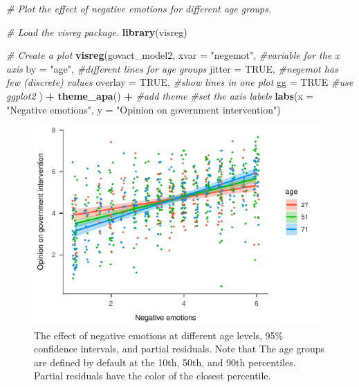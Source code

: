 \documentclass[doc,floatsintext]{apa6}
\newenvironment{Shaded}{\begin{snugshade}}{\end{snugshade}}
\newcommand{\KeywordTok}[1]{\textcolor[rgb]{0.13,0.29,0.53}{\textbf{#1}}}
\newcommand{\DataTypeTok}[1]{\textcolor[rgb]{0.13,0.29,0.53}{#1}}
\newcommand{\StringTok}[1]{\textcolor[rgb]{0.31,0.60,0.02}{#1}}
\newcommand{\CommentTok}[1]{\textcolor[rgb]{0.56,0.35,0.01}{\textit{#1}}}
\newcommand{\OtherTok}[1]{\textcolor[rgb]{0.56,0.35,0.01}{#1}}
\newcommand{\OperatorTok}[1]{\textcolor[rgb]{0.81,0.36,0.00}{\textbf{#1}}}
\newcommand{\NormalTok}[1]{#1}
\begin{document}
\begin{Shaded}
\begin{Highlighting}[]
\CommentTok{# Plot the effect of negative emotions for different age groups.}

\CommentTok{# Load the visreg package.}
\KeywordTok{library}\NormalTok{(visreg)}

\CommentTok{# Create a plot}
\KeywordTok{visreg}\NormalTok{(govact_model2, }
       \DataTypeTok{xvar =} \StringTok{"negemot"}\NormalTok{, }\CommentTok{#variable for the x axis}
       \DataTypeTok{by =} \StringTok{"age"}\NormalTok{, }\CommentTok{#different lines for age groups}
       \DataTypeTok{jitter =} \OtherTok{TRUE}\NormalTok{, }\CommentTok{#negemot has few (discrete) values}
       \DataTypeTok{overlay =} \OtherTok{TRUE}\NormalTok{, }\CommentTok{#show lines in one plot}
       \DataTypeTok{gg =} \OtherTok{TRUE} \CommentTok{#use ggplot2}
\NormalTok{       ) }\OperatorTok{+}
\StringTok{  }\KeywordTok{theme_apa}\NormalTok{() }\OperatorTok{+}\StringTok{ }\CommentTok{#add theme}
\StringTok{  }\CommentTok{#set the axis labels}
\StringTok{  }\KeywordTok{labs}\NormalTok{(}\DataTypeTok{x =} \StringTok{"Negative emotions"}\NormalTok{,}
       \DataTypeTok{y =} \StringTok{"Opinion on government intervention"}\NormalTok{)}
\end{Highlighting}
\end{Shaded}

\begin{figure}[H]
\centering
\includegraphics[width=11cm]{HelpMyCollaboratorUsesR_files/figure-latex/plotregline-1.pdf}
\caption{\label{fig:plotregline}The effect of negative emotions at different
age levels, 95\% confidence intervals, and partial residuals. Note that
The age groups are defined by default at the 10th, 50th, and 90th
percentiles. Partial residuals have the color of the closest
percentile.}
\end{figure}
\end{document}
